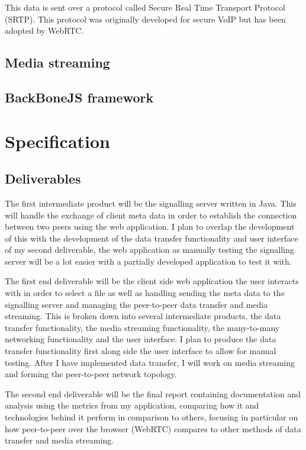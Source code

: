 \documentclass[]{report}
\begin{document}
			This data is sent over a protocol called Secure Real Time Transport Protocol (SRTP). This protocol was originally developed for secure VoIP but has been adopted by WebRTC. 
		
		\subsection*{Media streaming}
		\subsection*{BackBoneJS framework}
			
	\section{Specification}
			\subsection*{Deliverables}
			The first intermediate product will be the signalling server written in Java. This will handle the exchange of client meta data in order to establish the connection between two peers using the web application. I plan to overlap the development of this with the development of the data transfer functionality and user interface of my second deliverable, the web application as manually testing the signalling server will be a lot easier with a partially developed application to test it with.
			
			The first end deliverable will be the client side web application the user interacts with in order to select a file as 	well as handling sending the meta data to the signalling server and managing the peer-to-peer data transfer and media streaming. This is broken down into several intermediate products, the data transfer functionality, the media streaming functionality, the many-to-many networking functionality and the user interface. I plan to produce the data transfer functionality first along side the user interface to allow for manual testing. After I have implemented data transfer, I will work on media streaming and forming the peer-to-peer network topology. 
			
			The second end deliverable will be the final report containing documentation and analysis using the metrics	from my application, comparing how it and technologies behind it perform in comparison to others, focusing in particular on how peer-to-peer over the browser (WebRTC) compares to other methods of data transfer and media streaming.
			
\end{document}
